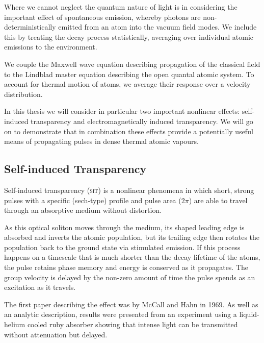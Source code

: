    Where we cannot neglect the quantum nature of light is in considering the
    important effect of spontaneous emission, whereby photons are non-
    deterministically emitted from an atom into the vacuum field modes. We
    include this by treating the decay process statistically, averaging over
    individual atomic emissions to the environment.\cite{loudon2000quantum}

    We couple the Maxwell wave equation describing propagation of the classical
    field to the Lindblad master equation describing the open quantal atomic
    system. To account for thermal motion of atoms, we average their response
    over a velocity distribution.\cite{foot2005atomic}

    In this thesis we will consider in particular two important nonlinear
    effects: self-induced transparency and electromagnetically induced
    transparency. We will go on to demonstrate that in combination these effects
    provide a potentially useful means of propagating pulses in dense thermal
    atomic vapours.


  \subsection*{Self-induced Transparency}

    Self-induced transparency (\textsc{sit}) is a nonlinear phenomena in which
    short, strong pulses with a specific (sech-type) profile and pulse area
    ($2\pi$) are able to travel through an absorptive medium without
    distortion.

    As this optical soliton moves through the medium, its shaped leading edge
    is absorbed and inverts the atomic population, but its trailing edge then
    rotates the population back to the ground state via stimulated
    emission.\cite{allen1975optical} If this process happens on a timescale that
    is much shorter than the decay lifetime of the atoms, the pulse retains
    phase memory and energy is conserved as it propagates. The group velocity is
    delayed by the non-zero amount of time the pulse spends as an excitation as
    it travels.

    The first paper describing the effect was by McCall and Hahn in
    1969.\cite{McCall1969} As well as an analytic description, results were
    presented from an experiment using a liquid-helium cooled ruby absorber
    showing that intense light can be transmitted without attenuation but
    delayed.

